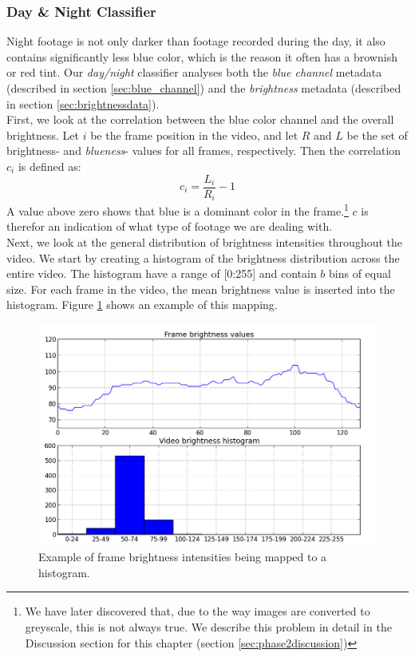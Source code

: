 \subsubsection{Day \& Night Classifier}\label{sec:daynightclassifier}
%
Night footage is not only darker than footage recorded during the day, it also contains significantly less blue color, which is the reason it often has a brownish or red tint. Our \textit{day/night} classifier analyses both the \textit{blue channel} metadata (described in section \ref{sec:blue_channel}) and the \textit{brightness} metadata (described in section \ref{sec:brightnessdata}).\\
First, we look at the correlation between the blue color channel and the overall brightness. Let $i$ be the frame position in the video, and let $R$ and $L$ be the set of brightness- and \textit{blueness}- values for all frames, respectively. Then the correlation $c_{i}$ is defined as:\\
%
\begin{equation}
c_{i} = \frac{L_{i}}{R_{i}} - 1
\end{equation}
%
A value above zero shows that blue is a dominant color in the frame.\footnote{We have later discovered that, due to the way images are converted to greyscale, this is not always true. We describe this problem in detail in the Discussion section for this chapter (section \ref{sec:phase2discussion})}
$c$ is therefor an indication of what type of footage we are dealing with.\\
Next, we look at the general distribution of brightness intensities throughout the video. We start by creating a histogram of the brightness distribution across the entire video. The histogram have a range of [0:255] and contain $b$ bins of equal size. For each frame in the video, the mean brightness value is inserted into the histogram. Figure \ref{fig:brightness_histogram} shows an example of this mapping.
%
\begin{figure}
     \centering
     \includegraphics[width=1\textwidth]{img/brightness_histogram.png}
     \caption{Example of frame brightness intensities being mapped to a histogram.}\label{fig:brightness_histogram}
\end{figure}
